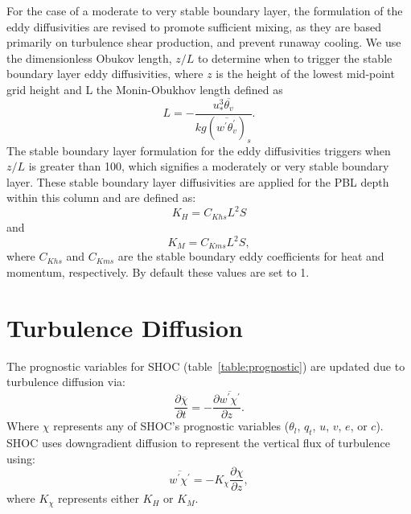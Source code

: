 \documentclass[12pt,titlepage]{article}
\numberwithin{equation}{section}
\begin{document}
For the case of a moderate to very stable boundary layer, the formulation of the eddy diffusivities are revised to promote sufficient mixing, as they are based primarily on turbulence shear production, and prevent runaway cooling.  We use the dimensionless Obukov length, $z/L$ to determine when to trigger the stable boundary layer eddy diffusivities, where $z$ is the height of the lowest mid-point grid height and L the Monin-Obukhov length defined as
%
\begin{equation}
  L=-\frac{u_{*}^{3}\overline{\theta_{v}}}{kg\left(\overline{w^{'}\theta^{'}_{v}}\right)_{s}}. 
  \label{monin}
\end{equation}
%
The stable boundary layer formulation for the eddy diffusivities triggers when $z/L$ is greater than 100, which signifies a moderately or very stable boundary layer.  These stable boundary layer diffusivities are applied for the PBL depth within this column and are defined as:
%
\begin{equation}
  K_{H}=C_{Khs} L^{2} S
  \label{diffusivity_heat}
\end{equation}
%
and
%
\begin{equation}
  K_{M}=C_{Kms} L^{2} S , 
  \label{diffusivity_momentum}
\end{equation}
%
where $C_{Khs}$ and $C_{Kms}$ are the stable boundary eddy coefficients for heat and momentum, respectively.  By default these values are set to 1. 
 
\section{Turbulence Diffusion}
\label{turb_diffusion}

The prognostic variables for SHOC (table~\ref{table:prognostic}) are updated due to turbulence diffusion via:
%
\begin{equation}
  \frac{\partial{\overline{\chi}}}{\partial{t}}= - \frac{\partial{\overline{w^{'}\chi^{'}}}}{\partial{z}} . 
  \label{turb_gov}
\end{equation}
%
Where $\chi$ represents any of SHOC's prognostic variables ($\theta_{l}$, $q_{t}$, $u$, $v$, $e$, or $c$).  SHOC uses downgradient diffusion to represent the vertical flux of turbulence using:
%
\begin{equation}
  \overline{w^{'}\chi^{'}} = -K_{\chi}\frac{\partial{\chi}}{\partial{z}}, 
  \label{vert_diffusion}
\end{equation}
%
where $K_{\chi}$ represents either $K_{H}$ or $K_{M}$.   
\end{document}
